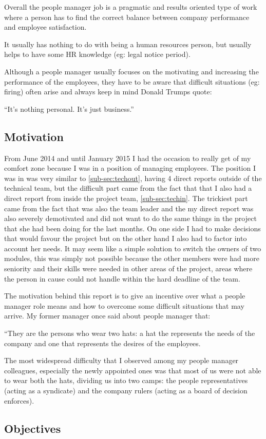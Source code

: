 Overall the people manager job is a pragmatic and results oriented type of work where a person has to find the correct balance between company performance and employee satisfaction.

It usually has nothing to do with being a human resources person, but usually helps to have some HR knowledge (eg: legal notice period). 

Although a people manager usually focuses on the motivating and increasing the performance of the employees, they have to be aware that difficult situations (eg: firing) often arise and always keep in mind Donald Trumps quote:

\begin{displayquote}
``It's nothing personal. It's just business.''
\end{displayquote}

\subsection{Motivation}
\label{sub-sec:Motivation}

From June 2014 and until January 2015 I had the occasion to really get of my comfort zone because I was in a position of managing employees. The position I was in was very similar to \ref{sub-sec:techout}, having 4 direct reports outside of the technical team, but the difficult part came from the fact that that I also had a direct report from inside the project team, \ref{sub-sec:techin}. The trickiest part came from the fact that was also the team leader and the my direct report was also severely demotivated and did not want to do the same things in the project that she had been doing for the last months. On one side I had to make decisions that would favour the project but on the other hand I also had to factor into account her needs. It may seem like a simple solution to switch the owners of two modules, this was simply not possible because the other members were had more seniority and their skills were needed in other areas of the project, areas where the person in cause could not handle within the hard deadline of the team.

The motivation behind this report is to give an incentive over what a people manager role means and how to overcome some difficult situations that may arrive. My former manager once said about people manager that:
\begin{displayquote}
``They are the persons who wear two hats: a hat the represents the needs of the company and one that represents the desires of the employees.
\end{displayquote}
The most widespread difficulty that I observed among my people manager colleagues, especially the newly appointed ones was that most of us were not able to wear both the hats, dividing us into two camps: the people representatives (acting as a syndicate) and the company rulers (acting as a board of decision enforces).

\subsection{Objectives}
\label{sub-sec:objectives}


